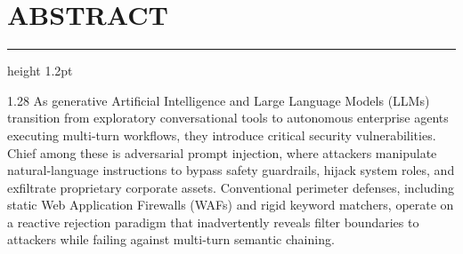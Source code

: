 \documentclass[12pt,a4paper,oneside]{report}
\begin{document}
\setcounter{page}{1}

\chapter*{ABSTRACT}
\hrule height 1.2pt
\vspace{0.12in}

\begin{spacing}{1.28}
As generative Artificial Intelligence and Large Language Models (LLMs) transition from exploratory conversational tools to autonomous enterprise agents executing multi-turn workflows, they introduce critical security vulnerabilities. Chief among these is adversarial prompt injection, where attackers manipulate natural-language instructions to bypass safety guardrails, hijack system roles, and exfiltrate proprietary corporate assets. Conventional perimeter defenses, including static Web Application Firewalls (WAFs) and rigid keyword matchers, operate on a reactive rejection paradigm that inadvertently reveals filter boundaries to attackers while failing against multi-turn semantic chaining.


\end{spacing}
\end{document}
